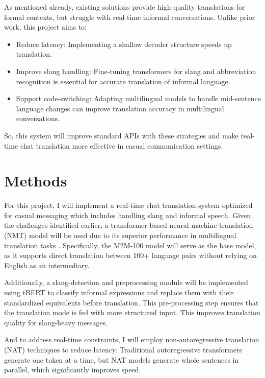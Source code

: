 \documentclass[10pt,twocolumn]{article}
\begin{document}
As mentioned already, existing solutions provide high-quality translations for formal contexts, but struggle with real-time informal conversations. Unlike prior work, this project aims to:

\begin{itemize}
    \item Reduce latency: Implementing a shallow decoder structure \cite{KasaiDeepEncoders2021} speeds up translation.
    \item Improve slang handling: Fine-tuning transformers for slang and abbreviation recognition is essential for accurate translation of informal language.
    \item Support code-switching: Adapting multilingual models to handle mid-sentence language changes can improve translation accuracy in multilingual conversations.
\end{itemize}
So, this system will improve standard APIs with these strategies and make real-time chat translation more effective in casual communication settings.


\section{Methods}

For this project, I will implement a real-time chat translation system optimized for casual messaging which includes handling slang and informal speech. Given the challenges identified earlier, a transformer-based neural machine translation (NMT) model will be used due to its superior performance in multilingual translation tasks \cite{VaswaniTransformers2017}. Specifically, the M2M-100 model \cite{FanEnglishCentric2021} will serve as the base model, as it supports direct translation between 100+ language pairs without relying on English as an intermediary.

Additionally, a slang-detection and preprocessing module will be implemented using tBERT \cite{PeinelttBERT2020} to classify informal expressions and replace them with their standardized equivalents before translation. This pre-processing step ensures that the translation mode is fed with more structured input. This improves translation quality for slang-heavy messages.

And to address real-time constraints, I will employ non-autoregressive translation (NAT) techniques \cite{GuNonAutoregressive2018} to reduce latency. Traditional autoregressive transformers generate one token at a time, but NAT models generate whole sentences in parallel, which significantly improves speed.
\end{document}
